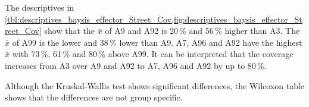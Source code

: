 The descriptives in \cref{tbl:descriptives_baysis_effector_Street_Cov,fig:descriptives_baysis_effector_Street_Cov} show that the $\bar{x}$ of A9 and A92 is 20\,\% and 56\,\% higher than A3. The $\bar{x}$ of A99 is the lower and 38\,\% lower than A9. A7, A96 and A92 have the highest $\bar{x}$ with 73\,\%, 61\,\% and 80\,\% above A99. It can be interpreted that the coverage increases from A3 over A9 and A92 to A7, A96 and A92 by up to 80\,\%.




 

 Although the Kruskal-Wallis test shows significant differences, the Wilcoxon table shows that the differences are not group specific. 

